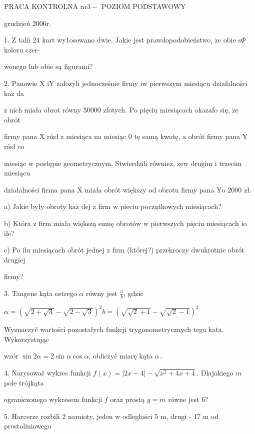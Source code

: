 \documentclass[a4paper,12pt]{article}
\begin{document}
PRACA KONTROLNA $\mathrm{n}\mathrm{r}3-$ POZIOM PODSTAWOWY

grudzień $2006\mathrm{r}.$

1. $\mathrm{Z}$ talii 24 kart wy1osowano dwie. Jakie jest prawdopodobieństwo, $\dot{\mathrm{z}}\mathrm{e}$ obie $\mathrm{s}\Phi$ koloru czer-

wonego lub obie są figurami?

2. Panowie X $\mathrm{i}\mathrm{Y}$ zafozyli jednocześnie firmy $\mathrm{i}\mathrm{w}$ pierwszym miesiącu dziafalności $\mathrm{k}\mathrm{a}\dot{\mathrm{z}}$ da

$\mathrm{z}$ nich miała obrot równy 50000 zfotych. Po pięciu miesiącach okazafo się, $\dot{\mathrm{z}}\mathrm{e}$ obrót

firmy pana X rósł $\mathrm{z}$ miesiąca na miesiąc $0$ tę samą kwotę, a obrót firmy pana $\mathrm{Y}$ rósł co

miesiąc $\mathrm{w}$ postępie geometrycznym. Stwierdzili równiez, $\dot{\mathrm{z}}\mathrm{e}\mathrm{w}$ drugim $\mathrm{i}$ trzecim miesiącu

działalności firma pana X miała obrót większy od obrotu firmy pana $\mathrm{Y}\mathrm{o}$ 2000 zł.

a) Jakie były obroty $\mathrm{k}\mathrm{a}\dot{\mathrm{z}}$ dej $\mathrm{z}$ firm $\mathrm{w}$ pieciu początkowych miesiącach?

b) Która $\mathrm{z}$ firm miała większą sumę obrotów $\mathrm{w}$ pierwszych pięciu miesiącach $\mathrm{i}\mathrm{o}$ ile?

c) Po ilu miesiącach obrót jednej $\mathrm{z}$ firm (której?) przekroczy dwukrotnie obrót drugiej

firmy?

3. Tangens kąta ostrego $\alpha$ równy jest $\displaystyle \frac{a}{b}$, gdzie

$\alpha=(\sqrt{2+\sqrt{3}}-\sqrt{2-\sqrt{3}})^{2}b=(\sqrt{\sqrt{2}+1}-\sqrt{\sqrt{2}-1})^{2}$

Wyznaczyč wartości pozostałych funkcji trygonometrycznych tego kata. Wykorzystując

wzór $\sin 2\alpha=2\sin\alpha\cos\alpha$, obliczyč miarę kąta $\alpha.$

4. Narysowač wykres funkcji $f(x)=|2x-4|-\sqrt{x^{2}+4x+4}$. Dlajakiego $m$ pole trójkąta

ograniczonego wykresem funkcji $f$ oraz prostą $y=m$ równe jest 6?

5. Harcerze rozbili 2 namioty, jeden $\mathrm{w}$ odległości 5 $\mathrm{m}$, drugi - 17 $\mathrm{m}$ od prostoliniowego
\end{document}
